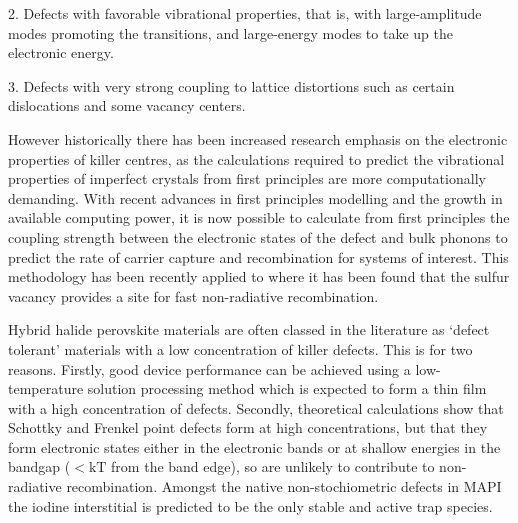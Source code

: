 \begin{displayquote}
2. Defects with favorable vibrational properties, that is, with large-amplitude modes promoting the transitions, and large-energy modes to take up the electronic energy.

3.  Defects with very strong coupling to lattice distortions such as certain dislocations and some vacancy centers.
\end{displayquote}

However historically there has been increased research emphasis on the electronic properties of killer centres, as the calculations required to predict the vibrational properties of imperfect crystals from first principles are more computationally demanding.
With recent advances in first principles modelling \autocite{Alkauskas2014,Alkauskas2016} and the growth in available computing power,\autocite{top500}
it is now possible to calculate from first principles the coupling strength between the electronic states of the defect and bulk phonons to predict the rate of carrier capture and recombination for systems of interest. 
This methodology has been recently applied to  where it has been found that the sulfur vacancy provides a site for fast non-radiative recombination.\autocite{Kim2018}

Hybrid halide perovskite materials are often classed in the literature as `defect tolerant' materials with a low concentration of killer defects. This is for two reasons. 
Firstly, good device performance can be achieved using a low-temperature solution processing method which is expected to form a thin film with a high concentration of defects. 
Secondly, theoretical calculations show that Schottky and Frenkel point defects form at high concentrations, but that they form electronic states either in the electronic bands or at shallow energies in the bandgap ($< \mathrm{kT}$ from the band edge), so are unlikely to contribute to non-radiative recombination.\autocite{Walsh2014b} 
Amongst the native non-stochiometric defects in MAPI the iodine interstitial is predicted to be the only stable and active trap species.\autocite{Meggiolaro2018}



